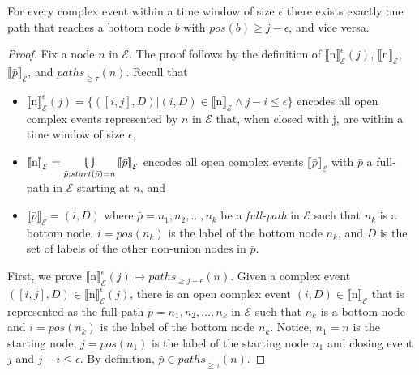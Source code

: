 \begin{theorem}\label{theorem:bijection}
For every complex event within a time window of size $\epsilon$ there exists exactly one path that reaches a bottom node $b$ with $pos(b) \ge j - \epsilon$, and vice versa.
\end{theorem}

\begin{proof}
  Fix a node $n$ in $\mathcal{E}$. The proof follows by the definition of ${\llbracket \text{n} \rrbracket}^{\epsilon}_{\mathcal{E}}(j)$, ${\llbracket \text{n} \rrbracket}_{\mathcal{E}}$, ${\llbracket \bar{p} \rrbracket}_{\mathcal{E}}$, and ${paths}_{\ge \tau}(n)$. Recall that

  \begin{itemize}
    \item ${\llbracket \text{n} \rrbracket}^{\epsilon}_{\mathcal{E}}(j) = \{ ([i,j], D) | (i,D) \in {\llbracket \text{n} \rrbracket}_{\mathcal{E}} \land j - i \le \epsilon \}$ encodes all open complex events represented by $n$ in $\mathcal{E}$ that, when closed with j, are within a time window of size $\epsilon$,
    \item ${\llbracket \text{n} \rrbracket}_{\mathcal{E}} = \bigcup\limits_{\bar{p};\\ start(\bar{p}) = n} {\llbracket \bar{p} \rrbracket}_{\mathcal{E}}$ encodes all open complex events ${\llbracket \bar{p} \rrbracket}_{\mathcal{E}}$ with $\bar{p}$ a full-path in $\mathcal{E}$ starting at $n$, and
    \item ${\llbracket \bar{p} \rrbracket}_{\mathcal{E}} = (i, D)$ where $\bar{p} = n_{1},n_{2}, \ldots, n_{k}$ be a \emph{full-path} in $\mathcal{E}$ such that $n_{k}$ is a bottom node, $i = pos(n_{k})$ is the label of the bottom node $n_{k}$, and $D$ is the set of labels of the other non-union nodes in $\bar{p}$.
  \end{itemize}

  First, we prove ${\llbracket \text{n} \rrbracket}^{\epsilon}_{\mathcal{E}}(j) \longmapsto paths_{\ge j - \epsilon}(n)$. Given a complex event $([i, j], D) \in {\llbracket \text{n} \rrbracket}^{\epsilon}_{\mathcal{E}}(j)$, there is an open complex event $(i, D) \in {\llbracket \text{n} \rrbracket}_{\mathcal{E}}$ that is represented as the full-path $\bar{p} = n_{1},n_{2}, \ldots, n_{k}$ in $\mathcal{E}$ such that $n_{k}$ is a bottom node and $i = pos(n_{k})$ is the label of the bottom node $n_{k}$. Notice, $n_{1} = n$ is the starting node, $j = pos(n_{1})$ is the label of the starting node $n_{1}$ and closing event $j$ and $j - i \le \epsilon$. By definition, $\bar{p} \in {paths}_{\ge \tau}(n)$.


\end{proof}
